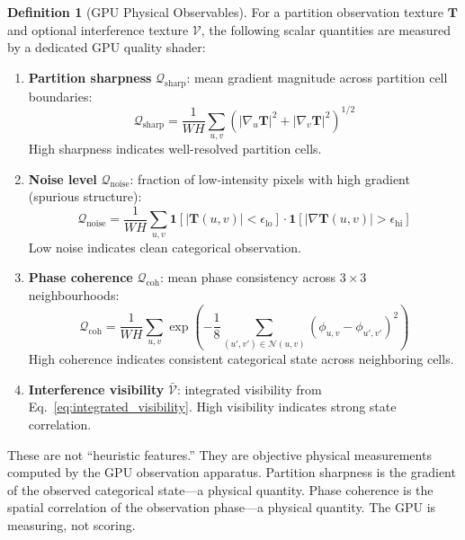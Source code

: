 \documentclass[11pt,twocolumn,a4paper]{article}
\theoremstyle{definition}
\newtheorem{definition}[theorem]{Definition}
\theoremstyle{remark}
\begin{document}
\begin{definition}[GPU Physical Observables]
\label{def:gpu_observables}
For a partition observation texture $\mathbf{T}$ and optional interference texture $\mathcal{V}$, the following scalar quantities are measured by a dedicated GPU quality shader:
\begin{enumerate}[nosep]
\item \textbf{Partition sharpness} $\mathcal{Q}_{\mathrm{sharp}}$: mean gradient magnitude across partition cell boundaries:
\begin{equation}
\mathcal{Q}_{\mathrm{sharp}} = \frac{1}{WH} \sum_{u,v} \left( |\nabla_u \mathbf{T}|^2 + |\nabla_v \mathbf{T}|^2 \right)^{1/2}
\label{eq:sharpness}
\end{equation}
High sharpness indicates well-resolved partition cells.

\item \textbf{Noise level} $\mathcal{Q}_{\mathrm{noise}}$: fraction of low-intensity pixels with high gradient (spurious structure):
\begin{equation}
\mathcal{Q}_{\mathrm{noise}} = \frac{1}{WH} \sum_{u,v} \mathbf{1}[|\mathbf{T}(u,v)| < \epsilon_{\mathrm{lo}}] \cdot \mathbf{1}[|\nabla \mathbf{T}(u,v)| > \epsilon_{\mathrm{hi}}]
\label{eq:noise}
\end{equation}
Low noise indicates clean categorical observation.

\item \textbf{Phase coherence} $\mathcal{Q}_{\mathrm{coh}}$: mean phase consistency across $3 \times 3$ neighbourhoods:
\begin{equation}
\mathcal{Q}_{\mathrm{coh}} = \frac{1}{WH} \sum_{u,v} \exp\!\left(- \frac{1}{8}\sum_{(u',v') \in \mathcal{N}(u,v)} (\phi_{u,v} - \phi_{u',v'})^2 \right)
\label{eq:coherence}
\end{equation}
High coherence indicates consistent categorical state across neighboring cells.

\item \textbf{Interference visibility} $\bar{\mathcal{V}}$: integrated visibility from Eq.~\eqref{eq:integrated_visibility}. High visibility indicates strong state correlation.
\end{enumerate}
\end{definition}

These are not ``heuristic features.'' They are objective physical measurements computed by the GPU observation apparatus. Partition sharpness is the gradient of the observed categorical state---a physical quantity. Phase coherence is the spatial correlation of the observation phase---a physical quantity. The GPU is measuring, not scoring.
\end{document}

